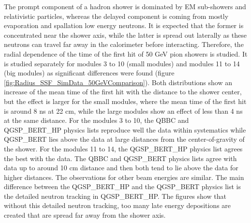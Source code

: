 \documentclass{JINST}
\begin{document}
The prompt component of a hadron shower is dominated by EM sub-showers and relativistic particles, whereas the delayed component is coming from mostly evaporation and spallation low energy neutrons. It is expected that the former is concentrated near the shower axis, while the latter is spread out laterally as these neutrons can travel far away in the calorimeter before interacting. Therefore, the radial dependence of the time of the first hit of 50 GeV pion showers is studied. It is studied separately for modules 3 to 10 (small modules) and modules 11 to 14 (big modules) as significant differences were found (figure \ref{fig:Radius_SSF_SimData_50GeVComparison}). Both distributions show an increase of the mean time of the first hit with the distance to the shower center, but the effect is larger for the small modules, where the mean time of the first hit is around 8 ns at 22 cm, while the large modules show an effect of less than 4 ns at the same distance.
For the modules 3 to 10, the QBBC and QGSP\_BERT\_HP physics lists reproduce well the data within systematics while QGSP\_BERT lies above the data at large distances from the center-of-gravity of the shower. For the modules 11 to 14, the QGSP\_BERT\_HP physics list agrees the best with the data. The QBBC and QGSP\_BERT physics lists agree with data up to around 10 cm distance and then both tend to lie above the data for higher distances. The observations for other beam energies are similar. The main difference between the QGSP\_BERT\_HP and the QGSP\_BERT physics list is the detailed neutron tracking in QGSP\_BERT\_HP. The figures show that without this detailed neutron tracking, too many late energy depositions are created that are spread far away from the shower axis.
\end{document}
